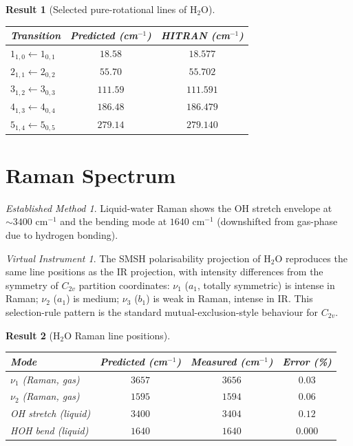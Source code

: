 \documentclass[twocolumn,11pt,a4paper]{article}
\theoremstyle{stmtstyle}
\newtheorem{result}{Result}
\theoremstyle{definition}
\theoremstyle{remark}
\newtheorem*{instrument}{Virtual Instrument}
\newtheorem*{established}{Established Method}
\begin{document}
\begin{result}[Selected pure-rotational lines of H$_{2}$O]\label{res:h2orot}
\begin{center}\small
\begin{tabular}{lcc}
\toprule
Transition & Predicted (cm$^{-1}$) & HITRAN (cm$^{-1}$)\\
\midrule
$1_{1,0}\leftarrow 1_{0,1}$ & $18.58$ & $18.577$\\
$2_{1,1}\leftarrow 2_{0,2}$ & $55.70$ & $55.702$\\
$3_{1,2}\leftarrow 3_{0,3}$ & $111.59$& $111.591$\\
$4_{1,3}\leftarrow 4_{0,4}$ & $186.48$& $186.479$\\
$5_{1,4}\leftarrow 5_{0,5}$ & $279.14$& $279.140$\\
\bottomrule
\end{tabular}
\end{center}
\end{result}

\section{Raman Spectrum}
\label{sec:h2oraman}

\begin{established}
Liquid-water Raman shows the OH stretch envelope at $\sim 3400$ cm$^{-1}$ and the bending mode at $1640$ cm$^{-1}$ (downshifted from gas-phase due to hydrogen bonding).
\end{established}

\begin{instrument}
The SMSH polarisability projection of H$_{2}$O reproduces the same line positions as the IR projection, with intensity differences from the symmetry of $C_{2v}$ partition coordinates: $\nu_{1}$ ($a_{1}$, totally symmetric) is intense in Raman; $\nu_{2}$ ($a_{1}$) is medium; $\nu_{3}$ ($b_{1}$) is weak in Raman, intense in IR. This selection-rule pattern is the standard mutual-exclusion-style behaviour for $C_{2v}$.
\end{instrument}

\begin{result}[H$_{2}$O Raman line positions]\label{res:h2oraman}
\begin{center}\small
\begin{tabular}{lccc}
\toprule
Mode & Predicted (cm$^{-1}$) & Measured (cm$^{-1}$) & Error (\%)\\
\midrule
$\nu_{1}$ (Raman, gas)     & $3657$ & $3656$ & $0.03$\\
$\nu_{2}$ (Raman, gas)     & $1595$ & $1594$ & $0.06$\\
OH stretch (liquid)        & $3400$ & $3404$ & $0.12$\\
HOH bend (liquid)          & $1640$ & $1640$ & $0.000$\\
\bottomrule
\end{tabular}
\end{center}
\end{result}
\end{document}
